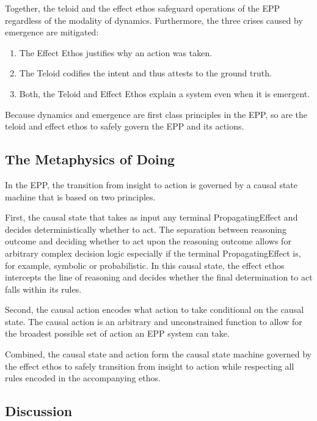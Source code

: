 Together, the teloid and the effect ethos safeguard operations of the EPP regardless of the modality of dynamics. Furthermore, the three crises caused by emergence are mitigated:

\begin{enumerate}
	\item The Effect Ethos justifies why an action was taken. 
	\item The Teloid codifies the intent and thus attests to the ground truth.
	\item Both, the Teloid and Effect Ethos explain a system even when it is emergent.
\end{enumerate}

Because dynamics and emergence are first class principles in the EPP, so are the
teloid and effect ethos to safely govern the EPP and its actions. 

\subsection{The Metaphysics of Doing} 
\label{sec:metaphysics_doing}

In the EPP, the transition from insight to action is governed by a causal state machine that is based on two principles.

 First, the causal state that takes as input any terminal PropagatingEffect and decides deterministically whether to act. The separation between reasoning outcome and deciding whether to act upon the reasoning outcome allows for arbitrary complex decision logic especially if the terminal PropagatingEffect is, for example, symbolic or probabilistic. In this causal state, the effect ethos intercepts the line of reasoning and decides whether the final determination to act falls within its rules. 
 
 Second, the causal action encodes what action to take conditional on the causal state. The causal action is an arbitrary and unconstrained function to allow for the broadest possible set of action an EPP system can take. 
 
 Combined, the causal state and action form the causal state machine governed by the effect ethos to safely transition from insight to action while respecting all rules encoded in the accompanying ethos. 

\subsection{Discussion} 
\label{sec:metaphysics_summary}

